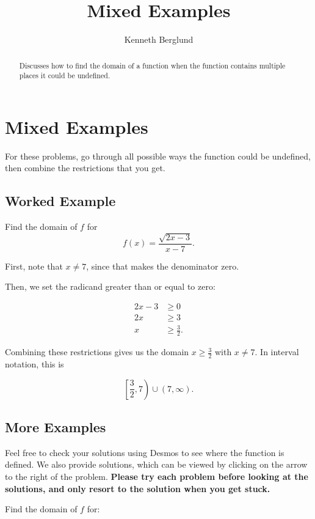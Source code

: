 \documentclass{ximera}
\title{Mixed Examples}
\author{Kenneth Berglund}
\begin{document}
\begin{abstract}
Discusses how to find the domain of  a function when the function contains multiple places it could be undefined. 
\end{abstract}
\maketitle

\section{Mixed Examples}
For these problems, go through all possible ways the function could be undefined, then combine the restrictions that you get.

\subsection{Worked Example}
Find the domain of $f$ for $$f(x) = \frac{\sqrt{2x - 3}}{x - 7}.$$

\begin{explanation}
First, note that $x \ne 7$, since that makes the denominator zero.

Then, we set the radicand greater than or equal to zero:

\begin{align*}2x-3&\ge 0 \\ 2x & \ge 3 \\ x & \ge \frac{3}{2}. \end{align*}

Combining these restrictions gives us the domain $x \ge \frac{3}{2}$ with $x \ne 7$. In interval notation, this is

$$\left[\frac{3}{2}, 7\right) \cup (7, \infty).$$
\end{explanation}
\subsection{More Examples}
Feel free to check your solutions using Desmos to see where the function is defined. We also provide solutions, which can be viewed by clicking on the arrow to the right of the problem. \textbf{Please try each problem before looking at the solutions, and only resort to the solution when you get stuck.} 

Find the domain of $f$ for:
\end{document}
